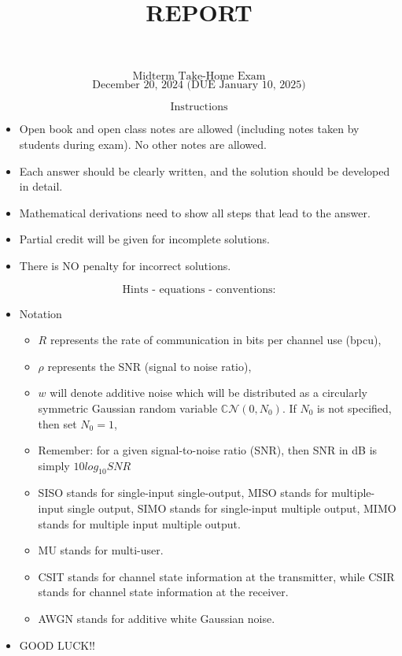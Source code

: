 \documentclass[11pt]{article}
\title{REPORT}
\begin{document}
    
    \maketitle
    
    

    
    \[
\text{Midterm Take-Home Exam}
\] \[
\text{December 20, 2024 (DUE January 10, 2025)}
\]

    \[
\text{Instructions}
\]

\begin{itemize}
\item
  Open book and open class notes are allowed (including notes taken by
  students during exam). No other notes are allowed.
\item
  Each answer should be clearly written, and the solution should be
  developed in detail.
\item
  Mathematical derivations need to show all steps that lead to the
  answer.
\item
  Partial credit will be given for incomplete solutions.
\item
  There is NO penalty for incorrect solutions.
\end{itemize}

    \[
\text{Hints - equations - conventions:}
\]

\begin{itemize}
\item
  Notation

  \begin{itemize}
  \item
    \(R\) represents the rate of communication in bits per channel use
    (bpcu),
  \item
    \(\rho\) represents the SNR (signal to noise ratio),
  \item
    \(w\) will denote additive noise which will be distributed as a
    circularly symmetric Gaussian random variable
    \(\mathbb{C}\mathcal{N}(0,N_0)\). If \(N_0\) is not specified, then
    set \(N_0 = 1\),
  \item
    Remember: for a given signal-to-noise ratio (SNR), then SNR in dB is
    simply \(10 log_{10} SNR\)
  \item
    SISO stands for single-input single-output, MISO stands for
    multiple-input single output, SIMO stands for single-input multiple
    output, MIMO stands for multiple input multiple output.
  \item
    MU stands for multi-user.
  \item
    CSIT stands for channel state information at the transmitter, while
    CSIR stands for channel state information at the receiver.
  \item
    AWGN stands for additive white Gaussian noise.
  \end{itemize}
\item
  GOOD LUCK!!
\end{itemize}
\end{document}
